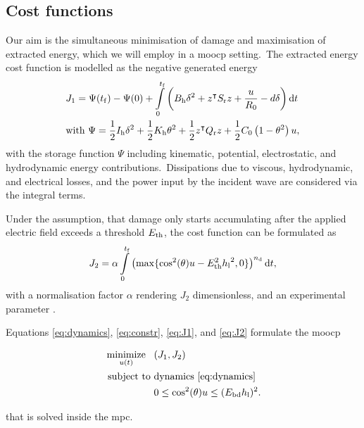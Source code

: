 \subsection{Cost functions}
Our aim is the simultaneous minimisation of damage and maximisation of extracted energy, which we will employ in a \ac{moocp} setting.\ 
The extracted energy cost function is modelled as the negative generated energy
\begin{equation}\label{eq:J1}
	\begin{split}
		& J_1 = \Psi(\tf)-\Psi(0) +\int_0^{\tf} \left(B_\mathrm{h}\delta^2 +z^\intercal S_\mathrm{r} z +\dfrac{u}{R_0} - d \delta\right) \text{d}t \\
		& \text{with}\ \Psi = \dfrac{1}{2}I_\mathrm{h}\delta^2+\dfrac{1}{2}K_\mathrm{h}{\theta}^2+ \dfrac{1}{2}z^\intercal Q_\mathrm{r} z + \dfrac{1}{2} C_0\left(1 - \theta^2 \right) u,
	\end{split}
\end{equation}
with the storage function $\Psi$ including kinematic, potential, electrostatic, and hydrodynamic energy contributions.\ 
Dissipations due to viscous, hydrodynamic, and electrical losses, and the power input by the incident wave are considered via the integral terms.\ 

Under the assumption, that damage only starts accumulating after the applied electric field exceeds a threshold $E_\mathrm{th}$, the cost function can be formulated as
\begin{equation}\label{eq:J2}
	J_2 = \alpha \int_0^{\tf} \left(\max \{ \cos^2(\theta)u-\Eth^2 {\hl}^2,0 \} \right)^{\nd} \text{d}t, 
\end{equation}
with a normalisation factor $\alpha$ rendering $J_2$ dimensionless,  and an experimental parameter \nd.\ 
\ 

Equations \eqref{eq:dynamics}, \eqref{eq:constr}, \eqref{eq:J1}, and \eqref{eq:J2} formulate the \ac{moocp}

\begin{problem}\label{prob:ocp}
	\begin{align}\label{eq:problem}
	\operatorname*{minimize}_{u(t)} \ \ \, &(J_1, J_2) \nonumber\\
	\ \text{subject to} \ &\text{dynamics}\ \eqref{eq:dynamics} \nonumber\\
	&0 \le \cos^2(\theta) u \le (E_\mathrm{bd} h_\mathrm{l})^2.
\end{align}
\end{problem}
that is solved inside the \ac{mpc}.